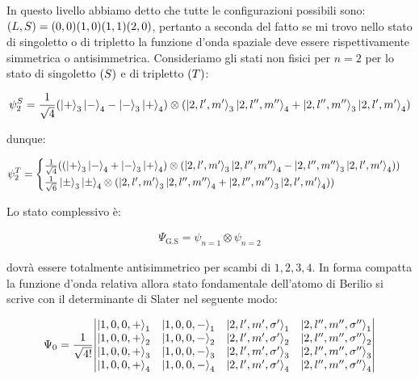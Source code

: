 \begin{itemize}
\begin{itemize}
			In questo livello abbiamo detto che tutte le configurazioni possibili sono: $\qty(L, S) = \qty(0, 0) \qty(1, 0) \qty(1, 1) \qty(2, 0)$, pertanto a seconda del fatto se mi trovo nello stato di singoletto o di tripletto la funzione d'onda spaziale deve essere rispettivamente simmetrica o antisimmetrica. Consideriamo gli stati non fisici per $n = 2$ per lo stato di singoletto $\qty(S)$ e di tripletto $\qty(T)$:
			
		\begin{align*}
			\psi_2^{S} = \frac{1}{\sqrt{4}} \qty(\ket{+}_3\ket{-}_4 - \ket{-}_3 \ket{+}_4) \otimes \qty( \ket{2, l', m'}_3 \ket{2, l'', m''}_4 + \ket{2, l'', m''}_3 \ket{2, l', m'}_4 )
		\end{align*}

			dunque:
			
		\begin{align*}
			\psi_2^{T} = \begin{cases}
    \frac{1}{\sqrt{4}} (\qty(\ket{+}_3\ket{-}_4 + \ket{-}_3 \ket{+}_4) \otimes \qty( \ket{2, l', m'}_3 \ket{2, l'', m''}_4 - \ket{2, l'', m''}_3 \ket{2, l', m'}_4 )) \\
    \frac{1}{\sqrt{6}} \ket{\pm}_3 \ket{\pm}_4 \otimes \qty( \ket{2, l', m'}_3 \ket{2, l'', m''}_4 + \ket{2, l'', m''}_3 \ket{2, l', m'}_4 ))
\end{cases}
		\end{align*}
			
	\end{itemize}

		Lo stato complessivo è:
	
	\begin{align*}
		\Psi_{\text{G.S}} = \psi_{n = 1} \otimes \psi_{n = 2}
	\end{align*}

		dovrà essere totalmente antisimmetrico per scambi di $1, 2, 3, 4$. In forma compatta la funzione d'onda relativa allora stato fondamentale dell'atomo di Berilio si scrive con il determinante di Slater nel seguente modo:	
		
	\begin{align*}
		\Psi_0 = \frac{1}{\sqrt{4!}} \mqty|  \ket{1, 0, 0, +}_1  &  \ket{1, 0, 0, -}_1 &  \ket{2, l', m', \sigma'}_1   &  \ket{2, l'', m'', \sigma''}_1   \\   \ket{1, 0, 0, +}_2  &  \ket{1, 0, 0, -}_2 &  \ket{2, l', m', \sigma'}_2   &  \ket{2, l'', m'', \sigma''}_2   \\  \ket{1, 0, 0, +}_3  &  \ket{1, 0, 0, -}_3 &  \ket{2, l', m', \sigma'}_3   &  \ket{2, l'', m'', \sigma''}_3   \\    \ket{1, 0, 0, +}_4  &  \ket{1, 0, 0, -}_4 &  \ket{2, l', m', \sigma'}_4   &  \ket{2, l'', m'', \sigma''}_4  |
	\end{align*}
	

\end{itemize}
